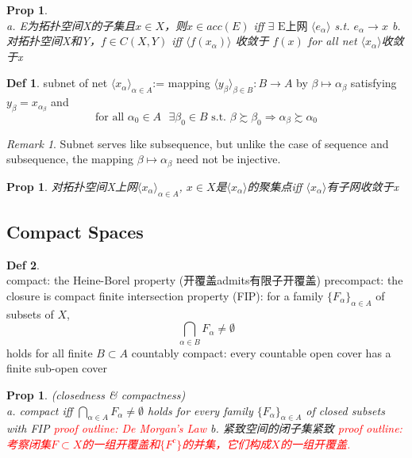 \documentclass[hidelinks]{article}
\theoremstyle{definition}
\newtheorem*{defin}{Def}
\theoremstyle{plain}
\newtheorem{proposition}[theorem]{Prop}
\theoremstyle{remark}
\newtheorem*{remark}{Remark}
\begin{document}
\begin{proposition}\label{Prop 4.9}~\\
a. E为拓扑空间X的子集且$x\in X$，则$x\in acc(E)$ iff $\exists \textrm{ E上网 } \langle e_\alpha\rangle$ s.t. $e_\alpha \to x$ \newline
b. 对拓扑空间X和Y，$f\in C(X,Y)$ iff $\langle f(x_\alpha)\rangle$ 收敛于 $f(x)$ for all net $\langle x_\alpha\rangle$收敛于x
\end{proposition}

\begin{defin}
subnet of net $\langle x_\alpha\rangle_{\alpha \in A}$:= mapping $\langle y_\beta\rangle_{\beta \in B}:B\to A$ by $\beta \mapsto \alpha_\beta$ satisfying $y_\beta=x_{\alpha_\beta}$ and
\[
\textrm{for all }\alpha_0\in A \textrm{ }\exists \beta_0\in B \textrm{ s.t. }\beta \succsim \beta_0 \Rightarrow \alpha_\beta \succsim \alpha_0
\]
\end{defin}

\begin{remark}
Subnet serves like subsequence, but unlike the case of sequence and subsequence, the mapping $\beta \mapsto \alpha_\beta$ need not be injective.
\end{remark}

\begin{proposition}
对拓扑空间X上网$\langle x_\alpha\rangle_{\alpha \in A}$, $x\in X$是$\langle x_\alpha\rangle$的聚集点iff $\langle x_\alpha\rangle$有子网收敛于x
\end{proposition}



\subsection{Compact Spaces}
\begin{defin}~\\
compact: the Heine-Borel property (开覆盖admits有限子开覆盖) \newline
precompact: the closure is compact \newline
finite intersection property (FIP): for a family $\{F_\alpha\}_{\alpha \in A}$ of subsets of $X$,
\[
\bigcap_{\alpha \in B}F_\alpha \neq \emptyset
\]
holds for all finite $B\subset A$ \newline
countably compact: every countable open cover has a finite sub-open cover
\end{defin}

\begin{proposition}\label{Prop 4.11}(closedness \& compactness)~\\
a. compact iff $\bigcap_{\alpha \in A}F_\alpha \neq \emptyset$ holds for every family $\{F_\alpha\}_{\alpha \in A}$ of closed subsets with FIP\newline
\textcolor{red}{proof outline: De Morgan's Law} \newline
b. 紧致空间的闭子集紧致 \newline
\textcolor{red}{proof outline: 考察闭集$F\subset X $的一组开覆盖和$\{F^c\}$的并集，它们构成$X$的一组开覆盖.}
\end{proposition}
\end{document}
